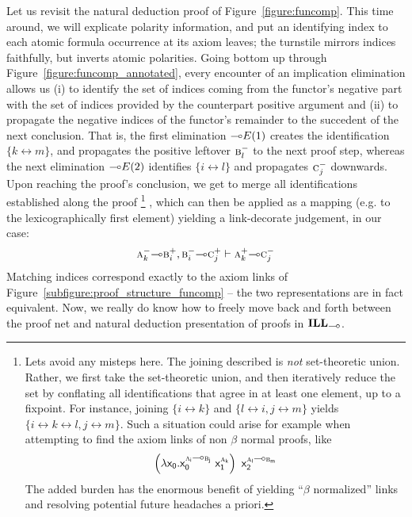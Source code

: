 Let us revisit the natural deduction proof of Figure~\ref{figure:funcomp}.
This time around, we will explicate polarity information, and put an identifying index to each atomic formula occurrence at its axiom leaves; 
the turnstile mirrors indices faithfully, but inverts atomic polarities.
Going bottom up through Figure~\ref{figure:funcomp_annotated}, every encounter of an implication elimination allows us (i) to identify the set of indices coming from the functor's negative part with the set of indices provided by the counterpart positive argument and (ii) to propagate the negative indices of the functor's remainder to the succedent of the next conclusion.
That is, the first elimination $\li E(1)$ creates the identification $\{k \leftrightarrow m\}$, and propagates the positive leftover $\nprop{B}_l$ to the next proof step, whereas the next elimination $\li E(2)$ identifies $\{i \leftrightarrow l\}$ and propagates $\nprop{C}_j$ downwards.
Upon reaching the proof's conclusion, we get to merge all identifications established along the proof%
\footnote{
Lets avoid any misteps here. The joining described is \textit{not} set-theoretic union. Rather, we first take the set-theoretic union, and then iteratively reduce the set by conflating all identifications that agree in at least one element, up to a fixpoint.
For instance, joining $\{ i \leftrightarrow k\}$ and $\{ l\leftrightarrow i, j \leftrightarrow m\}$ yields $\{i \leftrightarrow k \leftrightarrow l, j \leftrightarrow m \}$. Such a situation could arise for example when attempting to find the axiom links of non $\beta$ normal proofs, like
\[
\term{\left(\lambda x_0.x_0^{\prop{A}_i \li \prop{B}_j}~x_1^{\prop{A}_k}\right)~x_2^{\prop{A}_l \li \prop{B}_m}}
\]
The added burden has the enormous benefit of yielding ``$\beta$ normalized'' links and resolving potential future headaches a priori.
}%
, which can then be applied as a mapping (e.g. to the lexicographically first element) yielding a link-decorate judgement, in our case:
\[
	\nprop{A}_k \li \pprop{B}_i, \nprop{B}_i \li \pprop{C}_j \vdash \pprop{A}_k \li \nprop{C}_j
\]
Matching indices correspond exactly to the axiom links of Figure~\ref{subfigure:proof_structure_funcomp} -- the two representations are in fact equivalent.
Now, we really do know how to freely move back and forth between the proof net and natural deduction presentation of proofs in $\ILL_{\li}$.

